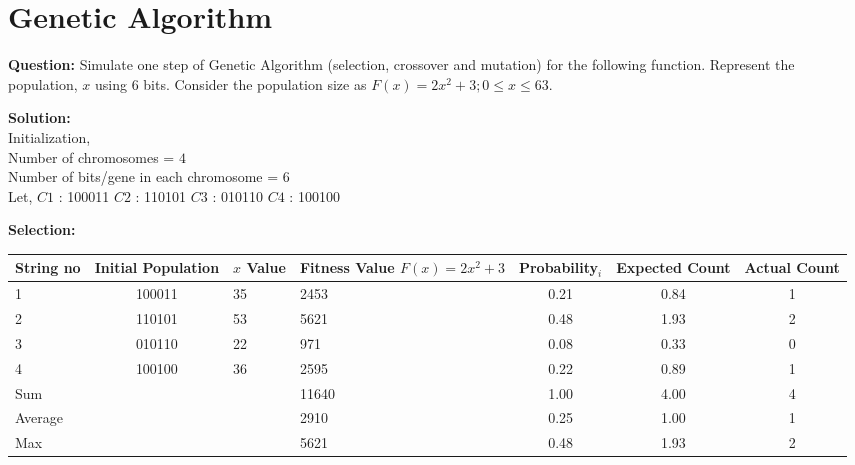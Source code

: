 \chapter{Genetic Algorithm}

\textbf{Question:} Simulate one step of Genetic Algorithm (selection, crossover and mutation) for the following function. Represent the population, $x$ using 6 bits. Consider the population size as $F(x) = {2x^2 + 3; 0 \leq x \leq 63}$.


\textbf{Solution:}\\[0.5em]
Initialization,\\
Number of chromosomes = $4$\\
Number of bits/gene in each chromosome = $6$\\
Let, $C1$ : 100011 \quad $C2$ : 110101 \quad $C3$ : 010110 \quad $C4$ : 100100

\vspace{1em}
\textbf{Selection:}\\[0.5em]
\begin{tabularx}{\textwidth}{|l|C|M{2cm}|M{3cm}|c|c|c|}
   \hline
   String no
   & Initial Population
   & $x$ Value
   & Fitness Value $F(x) = {2x^2 + 3}$
   & Probability$_i$
   & Expected Count
   & Actual Count
   \\\hline

   1 & 100011 & 35 & 2453 & 0.21 & 0.84 & 1 \\ & 110101 & 53 & 5621 & 0.48 & 1.93 & 2 \\ & 010110 & 22 & 971 & 0.08 & 0.33 & 0 \\ & 100100 & 36 & 2595 & 0.22 & 0.89 & 1 \\\hline

   Sum &&& 11640 & 1.00 & 4.00 & 4 \\\hline
   Average &&& 2910 & 0.25 & 1.00 & 1 \\\hline
   Max &&& 5621 & 0.48 & 1.93 & 2 \\\hline
\end{tabularx}

\vspace{1em}


